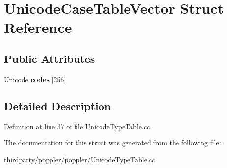 \hypertarget{struct_unicode_case_table_vector}{}\section{Unicode\+Case\+Table\+Vector Struct Reference}
\label{struct_unicode_case_table_vector}
\subsection*{Public Attributes}
\begin{DoxyCompactItemize}
\item 
\mbox{\label{struct_unicode_case_table_vector_a3a4ec5ee6ff371c961d86ddaad0f51e3}} 
Unicode {\bfseries codes} \mbox{[}256\mbox{]}
\end{DoxyCompactItemize}


\subsection{Detailed Description}


Definition at line 37 of file Unicode\+Type\+Table.\+cc.



The documentation for this struct was generated from the following file\+:\begin{DoxyCompactItemize}
\item 
thirdparty/poppler/poppler/Unicode\+Type\+Table.\+cc\end{DoxyCompactItemize}
